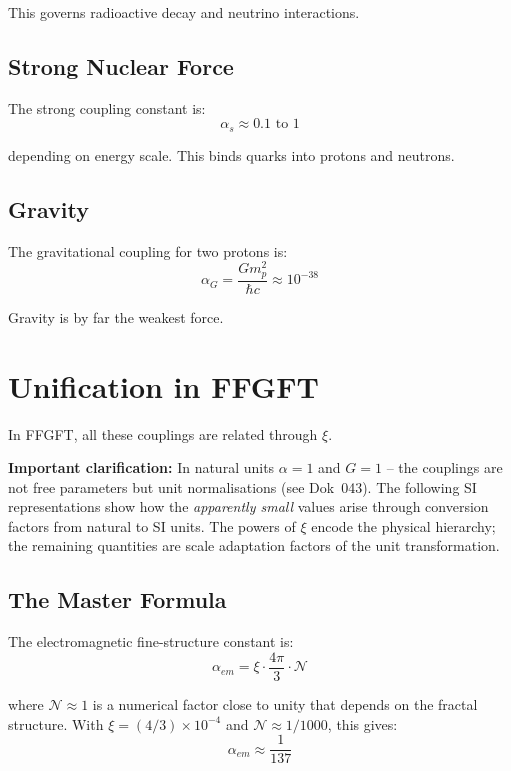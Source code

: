This governs radioactive decay and neutrino interactions.

\subsection{Strong Nuclear Force}

The strong coupling constant is:
\begin{equation}
\alpha_s \approx 0.1 \text{ to } 1
\end{equation}

depending on energy scale. This binds quarks into protons and neutrons.

\subsection{Gravity}

The gravitational coupling for two protons is:
\begin{equation}
\alpha_G = \frac{Gm_p^2}{\hbar c} \approx 10^{-38}
\end{equation}

Gravity is by far the weakest force.

\section{Unification in FFGFT}

In FFGFT, all these couplings are related through $\xi$.

\textbf{Important clarification:} In natural units $\alpha = 1$ and $G = 1$ -- the couplings are not free parameters but unit normalisations (see Dok~043). The following SI representations show how the \textit{apparently small} values arise through conversion factors from natural to SI units. The powers of $\xi$ encode the physical hierarchy; the remaining quantities are scale adaptation factors of the unit transformation.

\subsection{The Master Formula}

The electromagnetic fine-structure constant is:
\begin{equation}
\alpha_{em} = \xi \cdot \frac{4\pi}{3} \cdot \mathcal{N}
\end{equation}

where $\mathcal{N} \approx 1$ is a numerical factor close to unity that depends on the fractal structure. With $\xi = (4/3) \times 10^{-4}$ and $\mathcal{N} \approx 1/1000$, this gives:
\begin{equation}
\alpha_{em} \approx \frac{1}{137}
\end{equation}

